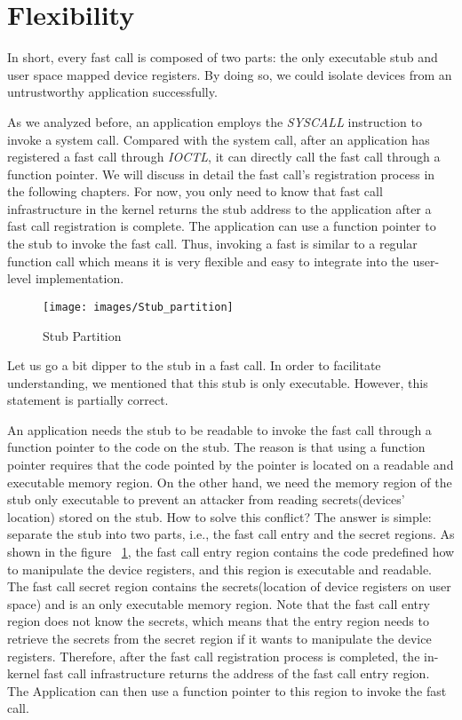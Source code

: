 \section{Flexibility}
In short, every fast call is composed of two parts: the only 
executable stub and user space mapped device registers. 
By doing so, we could isolate devices from an untrustworthy 
application successfully. 

As we analyzed before, an application employs the 
\emph{SYSCALL} instruction to invoke a system call. 
Compared with the system call, after an application has 
registered a fast call through \emph{IOCTL}, it can directly call 
the fast call through a function pointer. We will discuss 
in detail the fast call's registration process in the following 
chapters. For now, you only need to know that fast call infrastructure in the kernel 
returns the stub address to the application after a fast 
call registration is complete.  The application can use a 
function pointer to the stub to invoke the fast call. Thus, 
invoking a fast is similar to a regular function call which 
means it is very flexible and easy to integrate into the 
user-level implementation.

\begin{figure}[tbp]
  \centering
  \texttt{[image: images/Stub\_partition]}
  \caption[Stub Partition]{Stub Partition}
  \label{fig:Stub_partition}
\end{figure}

Let us go a bit dipper to the stub in a fast call. 
In order to facilitate understanding, we mentioned that this 
stub is only executable. However, this statement is partially correct. 

An application needs the stub to be readable to invoke 
the fast call through a function pointer to the code on 
the stub. The reason is that using a function pointer requires 
that the code pointed by the pointer is located on a readable 
and executable memory region. On the other hand, we need the 
memory region of the stub only executable to prevent an attacker 
from reading secrets(devices' location) stored on the stub. 
How to solve this conflict? The answer is simple: separate the 
stub into two parts, i.e., the fast call entry and the secret regions. 
As shown in the figure  ~\ref{fig:Stub_partition}, the fast 
call entry region contains the code predefined how to manipulate 
the device registers, and this region is executable and readable. 
The fast call secret region contains the secrets(location of device 
registers on user space) and is an only executable memory region. 
Note that the fast call entry region does not know the secrets, 
which means that the entry region needs to retrieve the secrets 
from the secret region if it wants to manipulate the device registers.
Therefore, after the fast call registration process is completed, the 
in-kernel fast call infrastructure returns the address of the fast call entry 
region. The Application can then use a function pointer to this region to invoke the fast call.
